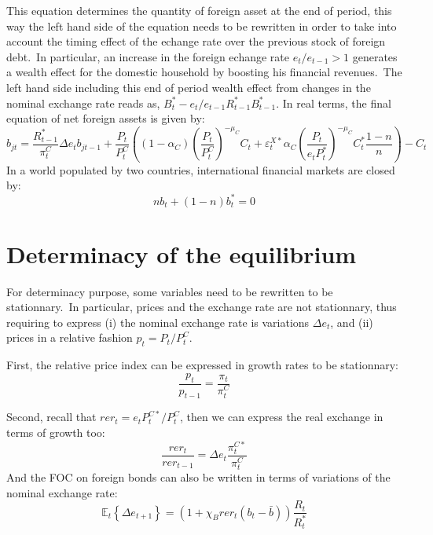 \documentclass[a4paper,12pt]{article}%
\begin{document}
This equation determines the quantity of foreign asset at the end of period,
this way the left hand side of the equation needs to be rewritten in order to
take into account the timing effect of the echange rate over the previous
stock of foreign debt.\ In particular, an increase in the foreign echange rate
$e_{t}/e_{t-1}>1$ generates a wealth effect for the domestic household by
boosting his financial revenues.\ The left hand side including this end of
period wealth effect from changes in the nominal exchange rate reads as,
$B_{t}^{\ast}-e_{t}/e_{t-1}R_{t-1}^{\ast}B_{t-1}^{\ast}.$ In real terms, the
final equation of net foreign assets is given by:%
\begin{equation}
b_{jt}=\frac{R_{t-1}^{\ast}}{\pi_{t}^{C}}\Delta e_{t}b_{jt-1}+\frac{P_{t}%
}{P_{t}^{C}}\left(  \left(  1-\alpha_{C}\right)  \left(  \frac{P_{t}}%
{P_{t}^{C}}\right)  ^{-\mu_{C}}C_{t}+\varepsilon_{t}^{X\ast}\alpha_{C}\left(
\frac{P_{t}}{e_{t}P_{t}^{\ast}}\right)  ^{-\mu_{C}}C_{t}^{\ast}\frac{1-n}%
{n}\right)  -C_{t}%
\end{equation}
In a world populated by two countries, international financial markets are
closed by:%
\begin{equation}
nb_{t}+\left(  1-n\right)  b_{t}^{\ast}=0
\end{equation}


\section{Determinacy of the equilibrium}

For determinacy purpose, some variables need to be rewritten to be
stationnary.\ In particular, prices and the exchange rate are not stationnary,
thus requiring to express (i) the nominal exchange rate is variations $\Delta
e_{t}$, and (ii) prices in a relative fashion $p_{t}=P_{t}/P_{t}^{C}$.

First, the relative price index can be expressed in growth rates to be
stationnary:%
\begin{equation}
\frac{p_{t}}{p_{t-1}}=\frac{\pi_{t}}{\pi_{t}^{C}}%
\end{equation}


Second, recall that $rer_{t}=e_{t}P_{t}^{C\ast}/P_{t}^{C}$, then we can
express the real exchange in terms of growth too:%
\begin{equation}
\frac{rer_{t}}{rer_{t-1}}=\Delta e_{t}\frac{\pi_{t}^{C\ast}}{\pi_{t}^{C}}%
\end{equation}
And the FOC on foreign bonds can also be written in terms of variations of the
nominal exchange rate:%
\begin{equation}
\mathbb{E}_{t}\left\{  \Delta e_{t+1}\right\}  =\left(  1+\chi_{B}%
rer_{t}\left(  b_{t}-\bar{b}\right)  \right)  \frac{R_{t}}{R_{t}^{\ast}}%
\end{equation}
\end{document}

